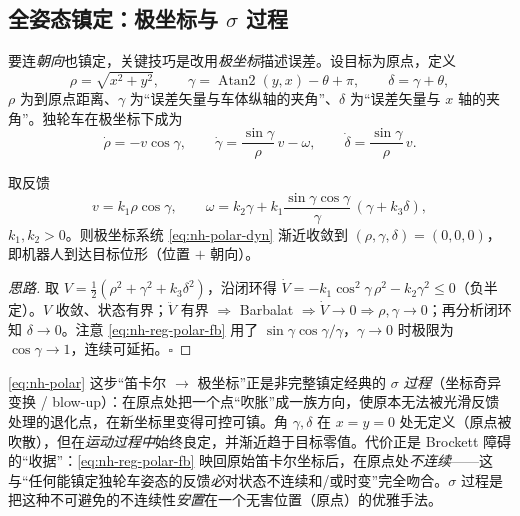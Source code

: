 \subsection{全姿态镇定：极坐标与 $\sigma$ 过程}
\label{sec:nh-reg-polar}

要连\emph{朝向}也镇定，关键技巧是改用\emph{极坐标}描述误差。设目标为原点，定义
\begin{equation}
  \rho=\sqrt{x^2+y^2},\qquad
  \gamma=\operatorname{Atan2}(y,x)-\theta+\pi,\qquad
  \delta=\gamma+\theta ,
  \label{eq:nh-polar}
\end{equation}
$\rho$ 为到原点距离、$\gamma$ 为“误差矢量与车体纵轴的夹角”、$\delta$ 为“误差矢量与 $x$ 轴的夹角”。独轮车在极坐标下成为
\begin{equation}
  \dot\rho=-v\cos\gamma,\qquad
  \dot\gamma=\frac{\sin\gamma}{\rho}\,v-\omega,\qquad
  \dot\delta=\frac{\sin\gamma}{\rho}\,v .
  \label{eq:nh-polar-dyn}
\end{equation}

\begin{theorem}\label{thm:nh-reg-polar}
取反馈
\begin{equation}
  v=k_1\rho\cos\gamma,\qquad
  \omega=k_2\gamma+k_1\frac{\sin\gamma\cos\gamma}{\gamma}\,(\gamma+k_3\delta),
  \label{eq:nh-reg-polar-fb}
\end{equation}
$k_1,k_2>0$。则极坐标系统 \cref{eq:nh-polar-dyn} 渐近收敛到 $(\rho,\gamma,\delta)=(0,0,0)$，即机器人到达目标位形（位置 $+$ 朝向）。
\end{theorem}

\begin{proof}[思路]
取 $V=\tfrac12(\rho^2+\gamma^2+k_3\delta^2)$，沿闭环得 $\dot V=-k_1\cos^2\gamma\,\rho^2-k_2\gamma^2\le0$（负半定）。$V$ 收敛、状态有界；$\ddot V$ 有界 $\Rightarrow$ Barbalat $\Rightarrow\dot V\to0\Rightarrow\rho,\gamma\to0$；再分析闭环知 $\delta\to0$。注意 \cref{eq:nh-reg-polar-fb} 用了 $\sin\gamma\cos\gamma/\gamma$，$\gamma\to0$ 时极限为 $\cos\gamma\to1$，连续可延拓。$\square$
\end{proof}

\begin{insight}\label{ins:nh-sigma}
\cref{eq:nh-polar} 这步“笛卡尔 $\to$ 极坐标”正是非完整镇定经典的 $\sigma$ \emph{过程}（坐标奇异变换 / blow-up）：在原点处把一个点“吹胀”成一族方向，使原本无法被光滑反馈处理的退化点，在新坐标里变得可控可镇。角 $\gamma,\delta$ 在 $x{=}y{=}0$ 处无定义（原点被吹散），但在\emph{运动过程中}始终良定，并渐近趋于目标零值。代价正是 Brockett 障碍的“收据”：\cref{eq:nh-reg-polar-fb} 映回原始笛卡尔坐标后，在原点处\emph{不连续}——这与“任何能镇定独轮车姿态的反馈\emph{必}对状态不连续和/或时变”完全吻合。$\sigma$ 过程是把这种不可避免的不连续性\emph{安置}在一个无害位置（原点）的优雅手法。
\end{insight}

